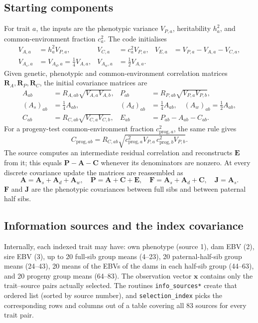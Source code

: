 \documentclass[11pt]{article}
\newcommand{\src}[1]{\texttt{#1}}
\newcommand{\ve}[1]{\boldsymbol{#1}}
\newcommand{\ma}[1]{\mathbf{#1}}
\begin{document}
\subsection{Starting components}
For trait $a$, the inputs are the phenotypic variance $V_{P,a}$, heritability $h_a^2$, and common-environment fraction $c_a^2$. The code initialises
\begin{align}\label{eq:components}
V_{A,a}&=h_a^2V_{P,a},&
V_{C,a}&=c_a^2V_{P,a},&
V_{E,a}&=V_{P,a}-V_{A,a}-V_{C,a},\\
V_{A_s,a}&=V_{A_d,a}=\tfrac14V_{A,a},&
V_{A_w,a}&=\tfrac12V_{A,a}.\nonumber
\end{align}
Given genetic, phenotypic and common-environment correlation matrices $\ma R_A,\ma R_P,\ma R_C$, the initial covariance matrices are
\begin{align}\label{eq:initcov}
A_{ab}&=R_{A,ab}\sqrt{V_{A,a}V_{A,b}},&
P_{ab}&=R_{P,ab}\sqrt{V_{P,a}V_{P,b}},\\
(A_s)_{ab}&=\tfrac14A_{ab},&
(A_d)_{ab}&=\tfrac14A_{ab},\quad(A_w)_{ab}=\tfrac12A_{ab},\nonumber\\
C_{ab}&=R_{C,ab}\sqrt{V_{C,a}V_{C,b}},&
E_{ab}&=P_{ab}-A_{ab}-C_{ab}.\nonumber
\end{align}
For a progeny-test common-environment fraction $c_{\mathrm{prog},a}^2$, the same rule gives
\begin{equation}
C_{\mathrm{prog},ab}=R_{C,ab}
\sqrt{c_{\mathrm{prog},a}^2V_{P,a}\,c_{\mathrm{prog},b}^2V_{P,b}}.
\end{equation}
The source computes an intermediate residual correlation and reconstructs $\ma E$ from it; this equals $\ma P-\ma A-\ma C$ whenever its denominators are nonzero. At every discrete covariance update the matrices are reassembled as
\begin{equation}\label{eq:reassemble}
\ma A=\ma A_s+\ma A_d+\ma A_w,\quad
\ma P=\ma A+\ma C+\ma E,\quad
\ma F=\ma A_s+\ma A_d+\ma C,\quad \ma J=\ma A_s.
\end{equation}
$\ma F$ and $\ma J$ are the phenotypic covariances between full sibs and between paternal half sibs.

\subsection{Information sources and the index covariance}\label{sec:sources}
Internally, each indexed trait may have: own phenotype (source 1), dam EBV (2), sire EBV (3), up to 20 full-sib group means (4--23), 20 paternal-half-sib group means (24--43), 20 means of the EBVs of the dams in each half-sib group (44--63), and 20 progeny group means (64--83). The observation vector $\ve x$ contains only the trait--source pairs actually selected. The routines \src{info\_sources*} create that ordered list (sorted by source number), and \src{selection\_index} picks the corresponding rows and columns out of a table covering all 83 sources for every trait pair.
\end{document}
